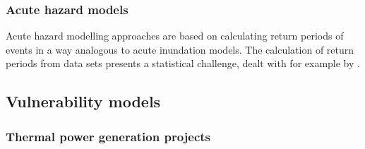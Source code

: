 \documentclass[a4paper,11pt]{extarticle} %
\theoremstyle{definition}
\begin{document}
\subsubsection{Acute hazard models}
Acute hazard modelling approaches are based on calculating return periods of events in a way analogous to acute inundation models. The calculation of return periods from data sets presents a statistical challenge, dealt with for example by \cite{MentaschiEtAl:2016}.

\subsection{Vulnerability models}

\setcounter{secnumdepth}{4}
\subsubsection{Thermal power generation projects}
\end{document}
